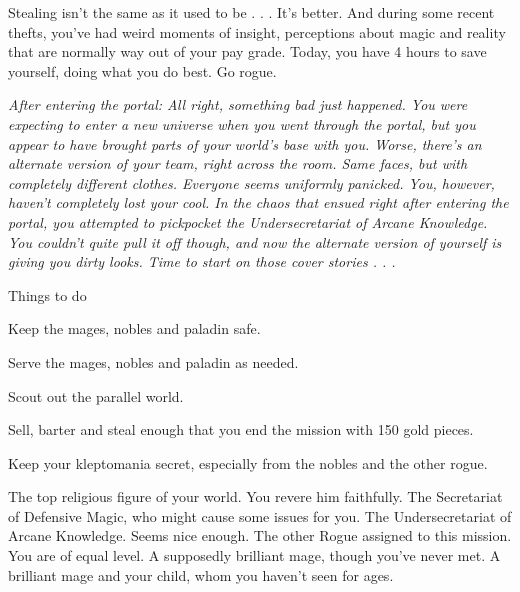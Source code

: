 \documentclass[char]{guildcamp3}
\begin{document}
Stealing isn't the same as it used to be . . . It's better. And during some recent thefts, you've had weird moments of insight, perceptions about magic and reality that are normally way out of your pay grade.  Today, you have 4 hours to save yourself, doing what you do best. Go rogue.

\em{After entering the portal:}
All right, something bad just happened. You were expecting to enter a new universe when you went through the portal, but you appear to have brought parts of your world's base with you. Worse, there's an alternate version of your team, right across the room. Same faces, but with completely different clothes. Everyone seems uniformly panicked.
You, however, haven't completely lost your cool. In the chaos that ensued right after entering the portal, you attempted to pickpocket the Undersecretariat of Arcane Knowledge. You couldn't quite pull it off though, and now the alternate version of yourself is giving you dirty looks. Time to start on those cover stories . . .

\begin{itemz}[Goals]
  \item Things to do
  \item Keep the mages, nobles and paladin safe.
  \item Serve the mages, nobles and paladin as needed.
  \item Scout out the parallel world.
  \item Sell, barter and steal enough that you end the mission with 150 gold pieces.
  \item Keep your kleptomania secret, especially from the nobles and the other rogue.  
\end{itemz}




\begin{contacts}
	\contact{\cPaladin{}} The top religious figure of your world. You revere him faithfully.
	\contact{\cNobleOne{}} The Secretariat of Defensive Magic, who might cause some issues for you.
	\contact{\cNobleTwo{}} The Undersecretariat of Arcane Knowledge. Seems nice enough.
	\contact{\cRogueOne{}} The other Rogue assigned to this mission. You are of equal level.
	\contact{\cMageOne{}} A supposedly brilliant mage, though you've never met.
    \contact{\cMageTwo{}} A brilliant mage and your child, whom you haven't seen for ages.
\end{contacts}
\end{document}
